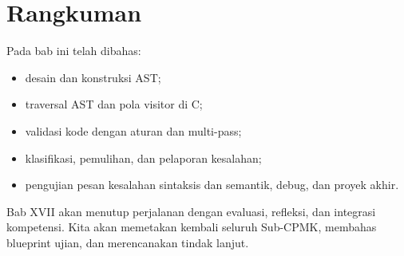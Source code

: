 \section*{Rangkuman}

Pada bab ini telah dibahas:
\begin{itemize}[leftmargin=*]
  \item desain dan konstruksi AST;
  \item traversal AST dan pola visitor di C;
  \item validasi kode dengan aturan dan multi-pass;
  \item klasifikasi, pemulihan, dan pelaporan kesalahan;
  \item pengujian pesan kesalahan sintaksis dan semantik, debug, dan
        proyek akhir.
\end{itemize}

Bab XVII akan menutup perjalanan dengan evaluasi, refleksi, dan
integrasi kompetensi. Kita akan memetakan kembali seluruh Sub-CPMK,
membahas blueprint ujian, dan merencanakan tindak lanjut.

